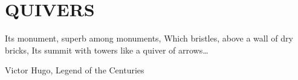 \section{QUIVERS}

Its monument, superb among monuments, Which bristles, above a wall of dry bricks, Its summit with towers like a quiver of arrows\ldots{}

Victor Hugo, Legend of the Centuries

